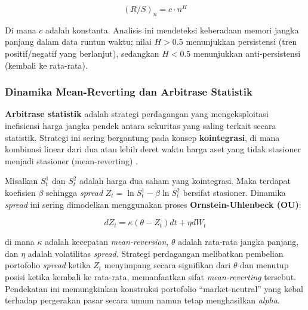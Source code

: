 \[ (R/S)_n = c \cdot n^H \]

Di mana $c$ adalah konstanta. Analisis ini mendeteksi keberadaan memori jangka panjang dalam data runtun waktu; nilai $H > 0.5$ menunjukkan persistensi (tren positif/negatif yang berlanjut), sedangkan $H < 0.5$ menunjukkan anti-persistensi (kembali ke rata-rata).

\subsubsection{Dinamika Mean-Reverting dan Arbitrase Statistik}
\textbf{Arbitrase statistik} adalah strategi perdagangan yang mengeksploitasi inefisiensi harga jangka pendek antara sekuritas yang saling terkait secara statistik. Strategi ini sering bergantung pada konsep \textbf{kointegrasi}, di mana kombinasi linear dari dua atau lebih deret waktu harga aset yang tidak stasioner menjadi stasioner (mean-reverting) \citep{li_statistical_2022}.

Misalkan $S_t^1$ dan $S_t^2$ adalah harga dua saham yang kointegrasi. Maka terdapat koefisien $\beta$ sehingga \textit{spread} $Z_t = \ln S_t^1 - \beta \ln S_t^2$ bersifat stasioner. Dinamika \textit{spread} ini sering dimodelkan menggunakan proses \textbf{Ornstein-Uhlenbeck (OU)}:

\[ dZ_t = \kappa (\theta - Z_t) dt + \eta dW_t \]

di mana $\kappa$ adalah kecepatan \textit{mean-reversion}, $\theta$ adalah rata-rata jangka panjang, dan $\eta$ adalah volatilitas \textit{spread}. Strategi perdagangan melibatkan pembelian portofolio \textit{spread} ketika $Z_t$ menyimpang secara signifikan dari $\theta$ dan menutup posisi ketika kembali ke rata-rata, memanfaatkan sifat \textit{mean-reverting} tersebut. Pendekatan ini memungkinkan konstruksi portofolio ``market-neutral'' yang kebal terhadap pergerakan pasar secara umum namun tetap menghasilkan \textit{alpha}.
